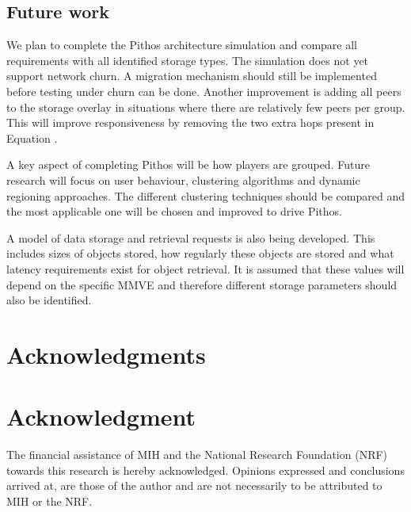 \documentclass[10pt,a4paper,conference]{IEEEtran}
\begin{document}
\subsection{Future work}
\label{future_work}

We plan to complete the Pithos architecture simulation and compare all requirements with all identified storage types. The simulation does not yet
support network churn. A migration mechanism should still be implemented before testing under churn can be done. Another improvement is adding all
peers to the storage overlay in situations where there are relatively few peers per group. This will improve responsiveness by removing the two extra
hops present in Equation .

A key aspect of completing Pithos will be how players are grouped. Future research will focus on user behaviour, clustering algorithms and dynamic
regioning approaches. The different clustering techniques should be compared and the most applicable one will be chosen and improved to drive Pithos.

A model of data storage and retrieval requests is also being developed. This includes sizes of objects stored, how regularly these objects are stored
and what latency requirements exist for object retrieval. It is assumed that these values will depend on the specific MMVE and therefore different
storage parameters should also be identified.


\ifCLASSOPTIONcompsoc
  \section*{Acknowledgments}
\else
  \section*{Acknowledgment}
\fi

The financial assistance of MIH and the National Research Foundation (NRF) towards this research is hereby acknowledged. Opinions expressed and
conclusions arrived at, are those of the author and are not necessarily to be attributed to MIH or the NRF.




\end{document}
